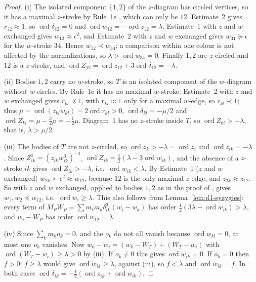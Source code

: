 \documentclass[Threeside,11pt]{article}
\theoremstyle{definition}
\theoremstyle{remark}
\numberwithin{equation}{section}
\theoremstyle{remark}
\newcommand{\ord}{\operatorname{ord}}
\begin{document}
\begin{proof}
(i) The isolated component $\{1,2\}$ of the $z$-diagram has circled vertices, so it has a
maximal $z$-stroke by Rule~1e \cite[p.~546]{AK}, which can only be $12$.  Estimate~2
\cite[p.~548]{AK} gives $r_{12}\approx1$, so $\ord\delta_{12}=0$ and $\ord w_{12}=-\ord
z_{12}=\lambda$.  Estimate~1 \cite[p.~548]{AK} with $z$ and $w$ exchanged gives
$w_{12}\approx\epsilon^2$, and Estimate~2 with $z$ and $w$ exchanged gives $w_{34}\succcurlyeq\epsilon$
for the $w$-stroke $34$.  Hence $w_{12}\prec w_{34}$; a comparison within one colour is not
affected by the normalizations, so $\lambda>\ord w_{34}=0$.  Finally $1,2$ are $z$-circled and
$12$ is a $z$-stroke, and $\ord Z_{12}=\ord z_{12}+3\ord\delta_{12}=-\lambda$.

(ii) Bodies $1,2$ carry no $w$-stroke, so $T$ is an isolated component of the $w$-diagram
without $w$-circles.  By Rule~1e it has no maximal $w$-stroke.  Estimate~2 with $z$ and $w$
exchanged gives $r_{kl}\preccurlyeq1$, with $r_{kl}\approx1$ only for a maximal $w$-edge, so
$r_{kl}\prec1$; thus $\mu=\ord(z_{kl}w_{kl})=2\ord r_{kl}>0$, $\ord\delta_{kl}=
-\mu/2$ and $\ord Z_{kl}=\mu-\frac32\mu=-\frac12\mu$.  Diagram~1 has no $z$-stroke inside $T$, so
$\ord Z_{kl}>-\lambda$, that is, $\lambda>\mu/2$.

(iii) The bodies of $T$ are not $z$-circled, so $\ord z_k>-\lambda=\ord z_i$ and $\ord
z_{ik}=-\lambda$.  Since $Z_{ik}^2=(z_{ik}w_{ik}^3)^{-1}$, $\ord Z_{ik}=\frac12(\lambda-3\ord
w_{ik})$, and the absence of a $z$-stroke $ik$ gives $\ord Z_{ik}>-\lambda$, i.e.\ $\ord
w_{ik}<\lambda$.  By Estimate~1 ($z$ and $w$ exchanged) $w_{2k}\succ\epsilon^2\approx w_{12}$,
because $12$ is the only maximal $z$-edge, and $z_{2k}\approx z_{12}$.  So
\cite[Prop.~1, p.~559]{AK} with $z$ and $w$ exchanged, applied to bodies $1,2$ as in the proof of
\cite[Prop.~4, p.~564]{AK}, gives $w_1,w_2\preccurlyeq w_{12}$, i.e.\ $\ord w_i\ge\lambda$.  This
also follows from Lemma~\ref{lem:d1-syzygies}: every term of $M_PW_P=\sum m_im_k\delta_{ik}^3
(w_i-w_k)$ has order $\frac12(3\lambda-\ord w_{ik})>\lambda$, and $w_i-W_P$ has order
$\ord w_{12}=\lambda$.

(iv) Since $\sum_km_ko_k=0$, and the $o_k$ do not all vanish because $\ord w_{kl}=0$, at most one
$o_k$ vanishes.  Now $w_k-w_i=(w_k-W_T)+(W_T-w_i)$ with $\ord(W_T-w_i)\ge\lambda>0$ by (iii).  If
$o_k\ne0$ this gives $\ord w_{ik}=0$.  If $o_k=0$ then $f>0$; $f\ge\lambda$ would give $\ord
w_{ik}\ge\lambda$, against (iii), so $f<\lambda$ and $\ord w_{ik}=f$.  In both cases
$\ord\delta_{ik}=-\frac12(\ord z_{ik}+\ord w_{ik})$.
\end{proof}
\end{document}
